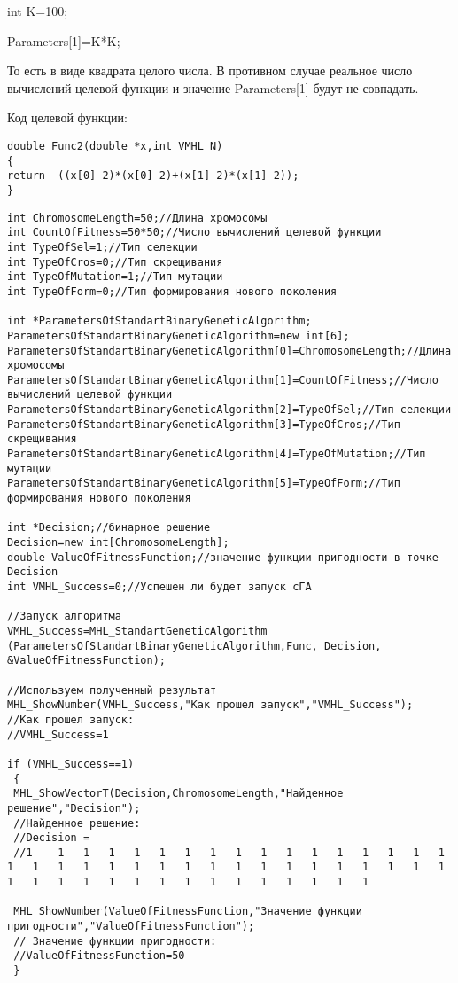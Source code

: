 \documentclass[a4paper,12pt]{article}
\begin{document}
int K=100;

Parameters[1]=K*K;

То есть в виде квадрата целого числа. В противном случае реальное число вычислений целевой функции и значение Parameters[1] будут не совпадать.

Код целевой функции:
\begin{lstlisting}[caption=Оптимизируемая функция]
double Func2(double *x,int VMHL_N)
{
return -((x[0]-2)*(x[0]-2)+(x[1]-2)*(x[1]-2));
}
\end{lstlisting}


\begin{lstlisting}[label=code_use_MHL_StandartGeneticAlgorithm,caption=Пример использования]
int ChromosomeLength=50;//Длина хромосомы
int CountOfFitness=50*50;//Число вычислений целевой функции
int TypeOfSel=1;//Тип селекции
int TypeOfCros=0;//Тип скрещивания
int TypeOfMutation=1;//Тип мутации
int TypeOfForm=0;//Тип формирования нового поколения

int *ParametersOfStandartBinaryGeneticAlgorithm;
ParametersOfStandartBinaryGeneticAlgorithm=new int[6];
ParametersOfStandartBinaryGeneticAlgorithm[0]=ChromosomeLength;//Длина хромосомы
ParametersOfStandartBinaryGeneticAlgorithm[1]=CountOfFitness;//Число вычислений целевой функции
ParametersOfStandartBinaryGeneticAlgorithm[2]=TypeOfSel;//Тип селекции
ParametersOfStandartBinaryGeneticAlgorithm[3]=TypeOfCros;//Тип скрещивания
ParametersOfStandartBinaryGeneticAlgorithm[4]=TypeOfMutation;//Тип мутации
ParametersOfStandartBinaryGeneticAlgorithm[5]=TypeOfForm;//Тип формирования нового поколения

int *Decision;//бинарное решение
Decision=new int[ChromosomeLength];
double ValueOfFitnessFunction;//значение функции пригодности в точке Decision
int VMHL_Success=0;//Успешен ли будет запуск cГА

//Запуск алгоритма
VMHL_Success=MHL_StandartGeneticAlgorithm (ParametersOfStandartBinaryGeneticAlgorithm,Func, Decision, &ValueOfFitnessFunction);

//Используем полученный результат
MHL_ShowNumber(VMHL_Success,"Как прошел запуск","VMHL_Success");
//Как прошел запуск:
//VMHL_Success=1

if (VMHL_Success==1)
 {
 MHL_ShowVectorT(Decision,ChromosomeLength,"Найденное решение","Decision");
 //Найденное решение:
 //Decision =
 //1	1	1	1	1	1	1	1	1	1	1	1	1	1	1	1	1	1	1	1	1	1	1	1	1	1	1	1	1	1	1	1	1	1	1	1	1	1	1	1	1	1	1	1	1	1	1	1	1	1

 MHL_ShowNumber(ValueOfFitnessFunction,"Значение функции пригодности","ValueOfFitnessFunction");
 // Значение функции пригодности:
 //ValueOfFitnessFunction=50
 }


\end{lstlisting}
\end{document}
